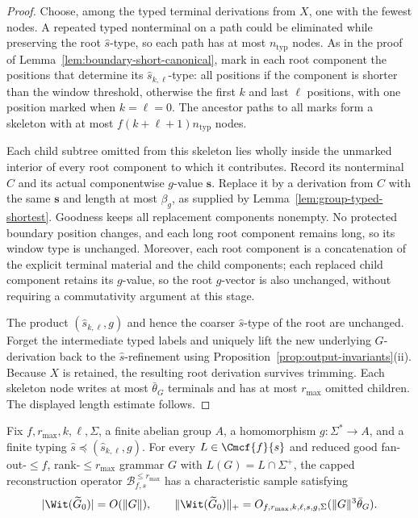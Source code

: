 \begin{proof}
Choose, among the typed terminal derivations
from $X$, one with the fewest nodes.
A repeated typed nonterminal on a path
could be eliminated while preserving the
root $\widehat{s}$-type, so each path has at most
$n_{\mathrm{typ}}$ nodes.
As in the proof of
Lemma~\ref{lem:boundary-short-canonical},
mark in each root component the positions
that determine its $\widehat{s}_{k,\ell}$-type:
all positions if the component is shorter
than the window threshold, otherwise the
first $k$ and last $\ell$ positions, with
one position marked when $k=\ell=0$.
The ancestor paths to all marks form a
skeleton with at most
$f(k+\ell+1)n_{\mathrm{typ}}$ nodes.

Each child subtree omitted from this
skeleton lies wholly inside the unmarked
interior of every root component to which
it contributes. Record its nonterminal
$C$ and its actual componentwise $g$-value
$\mathbf s$. Replace it by a derivation
from $C$ with the same $\mathbf s$
and length at most $\beta_g$, as supplied
by Lemma~\ref{lem:group-typed-shortest}.
Goodness keeps all replacement components
nonempty. No protected boundary position
changes, and each long root component
remains long, so its window type is
unchanged. Moreover, each root component
is a concatenation of the explicit
terminal material and the child components;
each replaced child component retains its
$g$-value, so the root $g$-vector is also
unchanged, without requiring a
commutativity argument at this stage.

The product $(\widehat{s}_{k,\ell},g)$ and hence
the coarser $\widehat{s}$-type of the root are
unchanged. Forget the intermediate typed
labels and uniquely lift the new
underlying $G$-derivation back to the
$\widehat{s}$-refinement using
Proposition~\ref{prop:output-invariants}(ii).
Because $X$ is retained, the resulting
root derivation survives trimming.
Each skeleton node writes at most
$\bar\theta_G$ terminals and has at most
$r_{\max}$ omitted children. The
displayed length estimate follows.
\end{proof}

\begin{theorem}
\label{thm:window-abelian-polydata}
Fix $f,r_{\max},k,\ell,\Sigma$, a
finite abelian group $A$, a homomorphism
$g:\Sigma^*\to A$, and a finite typing
$\widehat{s}\preceq(\widehat{s}_{k,\ell},g)$.
For every $L\in\Cmcf{f}{s}$ and reduced good
fan-out-$\le f$, rank-$\le r_{\max}$ grammar $G$
with $L(G)=L\cap\Sigma^+$, the capped
reconstruction operator $\mathcal B^{\le r_{\max}}_{f,s}$
has a characteristic sample
satisfying
\[
 |\Wit(\widetilde G_0)|=O(\|G\|),\qquad
 \|\Wit(\widetilde G_0)\|_+
   =O_{f,r_{\max},k,\ell,s,g,\Sigma}
     (\|G\|^3\bar\theta_G).
\]
\end{theorem}

